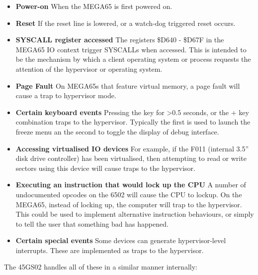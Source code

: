 \begin{itemize}
\item{\bf Power-on} When the MEGA65 is first powered on.
\item{\bf Reset} If the reset line is lowered, or a watch-dog triggered reset occurs.
\item{\bf SYSCALL register accessed} The registers \$D640 - \$D67F in the MEGA65 IO context trigger SYSCALLs when accessed.
  This is intended to be the mechanism by which a client operating system or process requests the attention of the hypervisor or operating system.
\item{\bf Page Fault} On MEGA65s that feature virtual memory, a page fault will cause a trap to hypervisor mode.
\item{\bf Certain keyboard events} Pressing the  key for >0.5 seconds, or the  +  key combination traps to the hypervisor.  Typically the first is used to launch the freeze menu an the second to toggle the display of debug interface.
\item{\bf Accessing virtualised IO devices} For example, if the F011 (internal 3.5'' disk drive controller) has been virtualised, then attempting to read or write sectors using this device will cause traps to the hypervisor.
  \item{\bf Executing an instruction that would lock up the CPU} A number of undocumented opcodes on the 6502 will cause the CPU to lockup.  On the MEGA65, instead of locking up, the computer will trap to the hypervisor.  This could be used to implement alternative instruction behaviours, or simply to tell the user that something bad has happened.
  \item{\bf Certain special events} Some devices can generate hypervisor-level interrupts. These are implemented as traps to the hypervisor.
\end{itemize}

The 45GS02 handles all of these in a similar manner internally:

